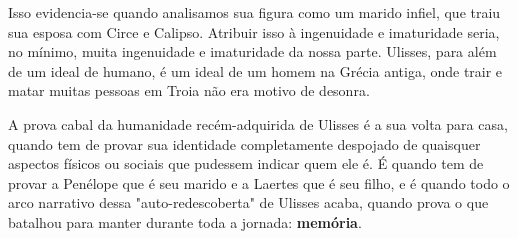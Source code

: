 \documentclass[12pt]{article}
\begin{document}
Isso evidencia-se quando analisamos sua figura como um marido infiel, que traiu sua esposa com Circe e Calipso. Atribuir isso à ingenuidade e imaturidade seria, no mínimo, muita ingenuidade e imaturidade da nossa parte. Ulisses, para além de um ideal de humano, é um ideal de um homem na Grécia antiga, onde trair e matar muitas pessoas em Troia não era motivo de desonra.

A prova cabal da humanidade recém-adquirida de Ulisses é a sua volta para casa, quando tem de provar sua identidade completamente despojado de quaisquer aspectos físicos ou sociais que pudessem indicar quem ele é. É quando tem de provar a Penélope que é seu marido e a Laertes que é seu filho, e é quando todo o arco narrativo dessa "auto-redescoberta" de Ulisses acaba, quando prova o que batalhou para manter durante toda a jornada: \textbf{memória}.

\nocite{*}
\printbibliography{}
\end{document}
